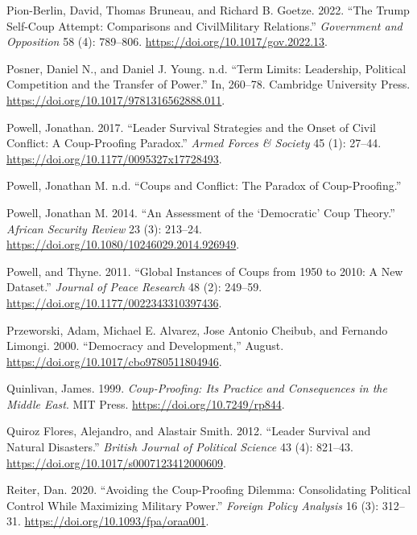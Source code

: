 \documentclass[
  12pt,
]{report}
\newlength{\cslhangindent}
\newenvironment{CSLReferences}[2] %
 {\begin{list}{}{%
  \setlength{\itemindent}{0pt}
  \setlength{\leftmargin}{0pt}
  \setlength{\parsep}{0pt}
  \ifodd #1
   \setlength{\leftmargin}{\cslhangindent}
   \setlength{\itemindent}{-1\cslhangindent}
  \fi
  \setlength{\itemsep}{#2\baselineskip}}}
 {\end{list}}
\begin{document}
\begin{CSLReferences}{1}{0}
Pion-Berlin, David, Thomas Bruneau, and Richard B. Goetze. 2022. {``The
Trump Self-Coup Attempt: Comparisons and Civil{\textendash}Military
Relations.''} \emph{Government and Opposition} 58 (4): 789--806.
\url{https://doi.org/10.1017/gov.2022.13}.

Posner, Daniel N., and Daniel J. Young. n.d. {``Term Limits: Leadership,
Political Competition and the Transfer of Power.''} In, 260--78.
Cambridge University Press.
\url{https://doi.org/10.1017/9781316562888.011}.

Powell, Jonathan. 2017. {``Leader Survival Strategies and the Onset of
Civil Conflict: A Coup-Proofing Paradox.''} \emph{Armed Forces \&
Society} 45 (1): 27--44. \url{https://doi.org/10.1177/0095327x17728493}.

Powell, Jonathan M. n.d. {``Coups and Conflict: The Paradox of
Coup-Proofing.''}

Powell, Jonathan M. 2014. {``An Assessment of the {`}Democratic{'} Coup
Theory.''} \emph{African Security Review} 23 (3): 213--24.
\url{https://doi.org/10.1080/10246029.2014.926949}.

Powell, and Thyne. 2011. {``Global Instances of Coups from 1950 to 2010:
A New Dataset.''} \emph{Journal of Peace Research} 48 (2): 249--59.
\url{https://doi.org/10.1177/0022343310397436}.

Przeworski, Adam, Michael E. Alvarez, Jose Antonio Cheibub, and Fernando
Limongi. 2000. {``Democracy and Development,''} August.
\url{https://doi.org/10.1017/cbo9780511804946}.

Quinlivan, James. 1999. \emph{Coup-Proofing: Its Practice and
Consequences in the Middle East}. MIT Press.
\url{https://doi.org/10.7249/rp844}.

Quiroz Flores, Alejandro, and Alastair Smith. 2012. {``Leader Survival
and Natural Disasters.''} \emph{British Journal of Political Science} 43
(4): 821--43. \url{https://doi.org/10.1017/s0007123412000609}.

Reiter, Dan. 2020. {``Avoiding the Coup-Proofing Dilemma: Consolidating
Political Control While Maximizing Military Power.''} \emph{Foreign
Policy Analysis} 16 (3): 312--31.
\url{https://doi.org/10.1093/fpa/oraa001}.


\end{CSLReferences}
\end{document}

